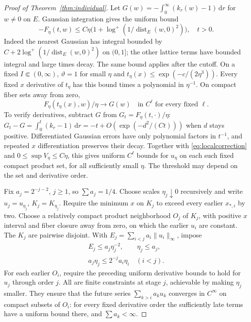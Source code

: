 \documentclass[11pt]{article}
\theoremstyle{remark}
\begin{document}
\begin{proof}[Proof of Theorem~\ref{thm:individual}]
Let $G(w)=-\int_0^\infty(k_r(w)-1)\,\mathrm dr$ for $w\ne0$ on $E$.
Gaussian integration gives the uniform bound
\begin{equation}\label{eq:offpolevalue}
 -F_\eta(t,w)\leq
 C\eta\bigl(1+\log^+(1/\operatorname{dist}_E(w,0)^2)\bigr),\quad t>0.
\end{equation}
Indeed the nearest Gaussian has integral bounded by
$C+2\log^+(1/\operatorname{dist}_E(w,0)^2)$ on $(0,1]$;
the other lattice terms have bounded integral and large times decay.
The same bound applies after the cutoff.
On a fixed $I\Subset(0,\infty)$, $\vartheta=1$ for small $\eta$ and
$t_\eta(x)\leq\exp(-c/(2\eta^3))$.
Every fixed $x$ derivative of $t_\eta$ has this bound times a polynomial
in $\eta^{-1}$. On compact fiber sets away from zero,
\[
 F_\eta(t_\eta(x),w)/\eta\longrightarrow G(w)
                   \quad\text{in }C^\ell\text{ for every fixed }\ell.
\]
To verify derivatives, subtract $G$ from $G_t=F_\eta(t,\cdot)/\eta$:
$G_t-G=\int_0^t(k_r-1)\,\mathrm dr=-t+O(\exp(-d^2/(Ct)))$ when
$d$ stays positive. Differentiated Gaussian errors have only polynomial
factors in $t^{-1}$, and repeated $x$ differentiation preserves their decay.
Together with \eqref{eq:localcorrection} and $0\leq\sup V_\eta\leq C\eta$,
this gives uniform $C^\ell$ bounds for $u_\eta$ on each such fixed compact
product set, for all sufficiently small $\eta$. The threshold may depend
on the set and derivative order.

Fix $a_j=2^{-j-2}$, $j\geq1$, so $\sum a_j=1/4$.
Choose scales $\eta_j\downarrow0$ recursively and write
$u_j=u_{\eta_j}$, $K_j=K_{\eta_j}$.
Require the minimum $x$ on $K_j$ to exceed every earlier $x_{*,i}$ by two.
Choose a relatively compact product neighborhood $O_j$ of $K_j$, with
positive $x$ interval and fiber closure away from zero, on which the earlier
$u_i$ are constant. The $K_j$ are pairwise disjoint.
With $E_j=\sum_{i<j}a_i\|u_i\|_\infty$, impose
\begin{gather*}
 E_j\leq a_j\eta_j^{-2},\qquad \eta_j\leq a_j,\\
 a_j\eta_j\leq2^{-j}a_i\eta_i\quad(i<j).
\end{gather*}
For each earlier $O_i$, require the preceding uniform derivative bounds to
hold for $u_j$ through order $j$. All are finite constraints at stage $j$,
achievable by making $\eta_j$ smaller. They ensure that the future series
$\sum_{k>i}a_ku_k$ converges in $C^\infty$ on compact subsets of $O_i$:
for every fixed derivative order the sufficiently late terms have a uniform
bound there, and $\sum a_k<\infty$.


\end{proof}
\end{document}
